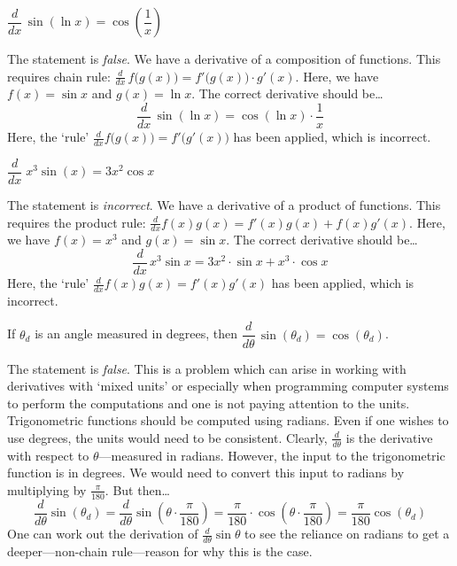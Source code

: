 \documentclass[11pt,letterpaper]{article}
\begin{document}
 $\dfrac{d}{dx} \, \sin(\ln x)= \cos \left( \dfrac{1}{x} \right)$ \pspace

\sol The statement is \textit{false}. We have a derivative of a composition of functions. This requires chain rule: $\frac{d}{dx}\, f \big( g(x) \big)= f' \big( g(x) \big) \cdot g'(x)$. Here, we have $f(x)= \sin x$ and $g(x)= \ln x$. The correct derivative should be\dots
	\[
	\dfrac{d}{dx} \, \sin(\ln x)= \cos(\ln x) \cdot \dfrac{1}{x}
	\]
Here, the `rule' $\frac{d}{dx} f \big( g(x) \big)= f' \big( g'(x) \big)$ has been applied, which is incorrect. \pvspace{1.3cm}



\newpage



 $\dfrac{d}{dx} \; x^3 \sin(x)= 3x^2 \cos x$ \pspace

\sol The statement is \textit{incorrect}. We have a derivative of a product of functions. This requires the product rule: $\frac{d}{dx} f(x) g(x)= f'(x) g(x) + f(x) g'(x)$. Here, we have $f(x)= x^3$ and $g(x)= \sin x$. The correct derivative should be\dots
	\[
	\dfrac{d}{dx}\, x^3 \sin x= 3x^2 \cdot \sin x + x^3 \cdot \cos x
	\]
Here, the `rule' $\frac{d}{dx} f(x) g(x)= f'(x) g'(x)$ has been applied, which is incorrect. \pvspace{1.3cm}



 If $\theta_d$ is an angle measured in degrees, then $\dfrac{d}{d\theta}\, \sin(\theta_d)= \cos(\theta_d)$. \pspace

\sol The statement is \textit{false}. This is a problem which can arise in working with derivatives with `mixed units' or especially when programming computer systems to perform the computations and one is not paying attention to the units. Trigonometric functions should be computed using radians. Even if one wishes to use degrees, the units would need to be consistent. Clearly, $\frac{d}{d\theta}$ is the derivative with respect to $\theta$---measured in radians. However, the input to the trigonometric function is in degrees. We would need to convert this input to radians by multiplying by $\frac{\pi}{180}$. But then\dots
	\[
	\dfrac{d}{d\theta} \sin(\theta_d)= \dfrac{d}{d\theta} \sin \left(\theta \cdot \dfrac{\pi}{180} \right)= \dfrac{\pi}{180} \cdot \cos \left(\theta \cdot \dfrac{\pi}{180} \right)= \dfrac{\pi}{180} \cos \left( \theta_d \right)
	\]
One can work out the derivation of $\frac{d}{d\theta} \sin \theta$ to see the reliance on radians to get a deeper---non-chain rule---reason for why this is the case. \pvspace{1.3cm}



\end{document}
